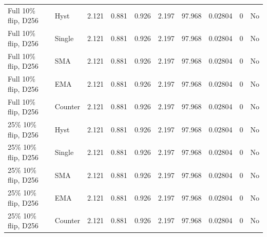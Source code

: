 \begin{table}[!htbp]
\begin{tabular}{llrrrrrrrl}
Full 10\% flip, D256 & Hyst & 2.121 & 0.881 & 0.926 & 2.197 & 97.968 & 0.02804 & 0 & No \\
Full 10\% flip, D256 & Single & 2.121 & 0.881 & 0.926 & 2.197 & 97.968 & 0.02804 & 0 & No \\
Full 10\% flip, D256 & SMA & 2.121 & 0.881 & 0.926 & 2.197 & 97.968 & 0.02804 & 0 & No \\
Full 10\% flip, D256 & EMA & 2.121 & 0.881 & 0.926 & 2.197 & 97.968 & 0.02804 & 0 & No \\
Full 10\% flip, D256 & Counter & 2.121 & 0.881 & 0.926 & 2.197 & 97.968 & 0.02804 & 0 & No \\
25\% 10\% flip, D256 & Hyst & 2.121 & 0.881 & 0.926 & 2.197 & 97.968 & 0.02804 & 0 & No \\
25\% 10\% flip, D256 & Single & 2.121 & 0.881 & 0.926 & 2.197 & 97.968 & 0.02804 & 0 & No \\
25\% 10\% flip, D256 & SMA & 2.121 & 0.881 & 0.926 & 2.197 & 97.968 & 0.02804 & 0 & No \\
25\% 10\% flip, D256 & EMA & 2.121 & 0.881 & 0.926 & 2.197 & 97.968 & 0.02804 & 0 & No \\
25\% 10\% flip, D256 & Counter & 2.121 & 0.881 & 0.926 & 2.197 & 97.968 & 0.02804 & 0 & No \\
\bottomrule
\end{tabular}
\end{table}
